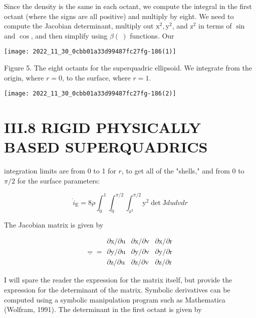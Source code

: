 Since the density is the same in each octant, we compute the integral in the first octant (where the signs are all positive) and multiply by eight. We need to compute the Jacobian determinant, multiply out $\mathrm{x}^{2}, \mathrm{y}^{2}$, and $\mathrm{z}^{2}$ in terms of $\sin$ and $\cos$, and then simplify using $\beta(~)$ functions. Our

\begin{center}
\texttt{[image: 2022\_11\_30\_0cbb01a33d99487fc27fg-186(1)]}
\end{center}

Figure 5. The eight octants for the superquadric ellipsoid. We integrate from the origin, where $r=0$, to the surface, where $r=1$.

\begin{center}
\texttt{[image: 2022\_11\_30\_0cbb01a33d99487fc27fg-186(2)]}
\end{center}

\section{III.8 RIGID PHYSICALLY BASED SUPERQUADRICS}
integration limits are from 0 to 1 for $r$, to get all of the "shells," and from 0 to $\pi / 2$ for the surface parameters:

$$
\dot{i}_{\mathrm{E}}=8 \rho \int_{0}^{1} \int_{0}^{\pi / 2} \int_{\mathrm{z}^{2}}^{\pi / 2} \mathrm{y}^{2} \operatorname{det} \mathrm{J} d u d v d r
$$

The Jacobian matrix is given by

$$
\underline{=}=\begin{array}{llll}
\partial \mathrm{x} / \partial \mathrm{u} & \partial \mathrm{x} / \partial \mathrm{v} & \partial \mathrm{x} / \partial \mathrm{r} \\
\partial \mathrm{y} / \partial \mathrm{u} & \partial \mathrm{y} / \partial \mathrm{v} & \partial \mathrm{y} / \partial \mathrm{r} \\
\partial \mathrm{z} / \partial \mathrm{u} & \partial \mathrm{z} / \partial \mathrm{v} & \partial \mathrm{z} / \partial \mathrm{r}
\end{array}
$$

I will spare the reader the expression for the matrix itself, but provide the expression for the determinant of the matrix. Symbolic derivatives can be computed using a symbolic manipulation program such as Mathematica (Wolfram, 1991). The determinant in the first octant is given by

